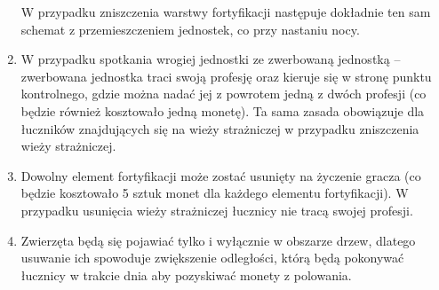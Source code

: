 \documentclass[12pt, a4paper]{article}
\begin{document}
\begin{enumerate}
W przypadku zniszczenia warstwy fortyfikacji następuje dokładnie ten sam schemat z przemieszczeniem jednostek, co przy nastaniu nocy.
\item W przypadku spotkania wrogiej jednostki ze zwerbowaną jednostką -- zwerbowana jednostka traci swoją profesję oraz kieruje się w stronę punktu kontrolnego, gdzie można nadać jej z powrotem jedną z dwóch profesji (co będzie również kosztowało jedną monetę). Ta sama zasada obowiązuje dla łuczników znajdujących się na wieży strażniczej w przypadku zniszczenia wieży strażniczej.
\item Dowolny element fortyfikacji może zostać usunięty na życzenie gracza (co będzie kosztowało 5 sztuk monet dla każdego elementu fortyfikacji). W przypadku usunięcia wieży strażniczej łucznicy nie tracą swojej profesji.
\item Zwierzęta będą się pojawiać tylko i wyłącznie w obszarze drzew, dlatego usuwanie ich spowoduje zwiększenie odległości, którą będą pokonywać łucznicy w trakcie dnia aby pozyskiwać monety z polowania.
\end{enumerate}
\end{document}
